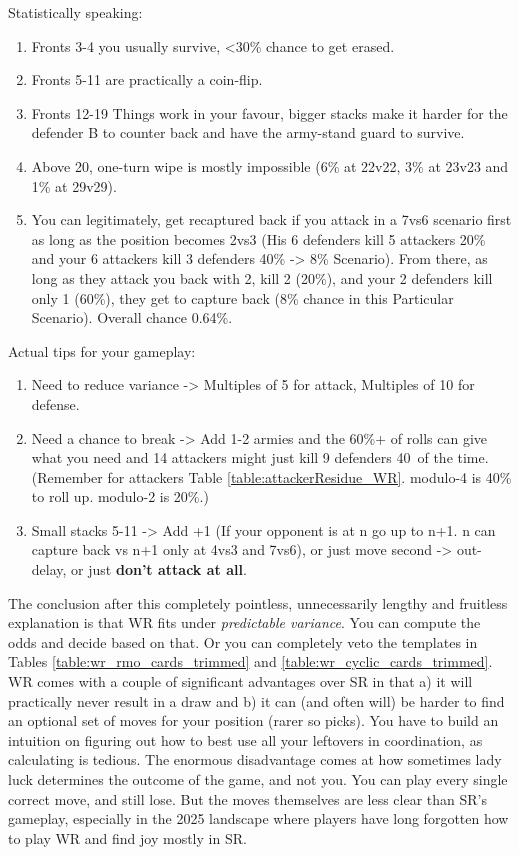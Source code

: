 Statistically speaking:
\begin{enumerate}
    \item Fronts 3-4 you usually survive, <30\% chance to get erased.
    \item Fronts 5-11 are practically a coin-flip.
    \item Fronts 12-19 Things work in your favour, bigger stacks make it harder for the defender B to counter back and have the army-stand guard to survive.
    \item Above 20, one-turn wipe is mostly impossible (6\% at 22v22, 3\% at 23v23 and 1\% at 29v29).
    \item You can legitimately, get recaptured back if you attack in a 7vs6 scenario first as long as the position becomes 2vs3 (His 6 defenders kill 5 attackers 20\% and your 6 attackers kill 3 defenders 40\% -> 8\% Scenario). From there, as long as they attack you back with 2, kill 2 (20\%), and your 2 defenders kill only 1 (60\%), they get to capture back (8\% chance in this Particular Scenario). Overall chance 0.64\%.
\end{enumerate}
Actual tips for your gameplay:
\begin{enumerate}
    \item Need to reduce variance -> Multiples of 5 for attack, Multiples of 10 for defense.
    \item Need a chance to break -> Add 1-2 armies and the 60\%+ of rolls can give what you need and 14 attackers might just kill 9 defenders 40\ of the time. (Remember for attackers Table \ref{table:attackerResidue_WR}. modulo-4 is 40\% to roll up. modulo-2 is 20\%.)
    \item Small stacks 5-11 -> Add +1 (If your opponent is at n go up to n+1. n can capture back vs n+1 only at 4vs3 and 7vs6), or just move second -> out-delay, or just \textbf{don't attack at all}. 
\end{enumerate}

The conclusion after this completely pointless, unnecessarily lengthy and fruitless explanation is that WR fits under \textit{predictable variance}. You can compute the odds and decide based on that. Or you can completely veto the templates in Tables \ref{table:wr_rmo_cards_trimmed} and \ref{table:wr_cyclic_cards_trimmed}.  WR comes with a couple of significant advantages over SR in that a) it will practically never result in a draw and b) it can (and often will) be harder to find an optional set of moves for your position (rarer so picks). You have to build an intuition on figuring out how to best  use all your leftovers in coordination, as calculating is tedious. The enormous disadvantage comes at how sometimes lady luck determines the outcome of the game, and not you. You can play every single correct move, and still lose. But the moves themselves are less clear than SR's gameplay, especially in the 2025 landscape where players have long forgotten how to play WR and find joy mostly in SR. 